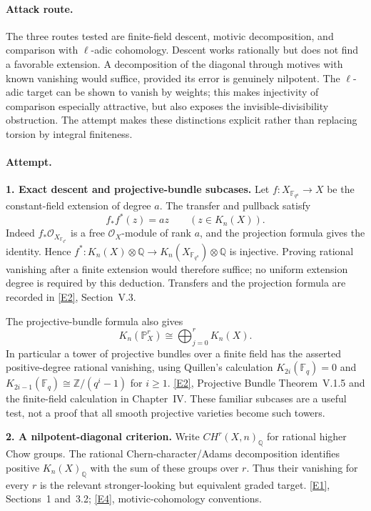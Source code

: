 \documentclass[11pt,a4paper]{article}
\newcommand{\Z}{\mathbb{Z}}
\newcommand{\Q}{\mathbb{Q}}
\newcommand{\F}{\mathbb{F}}
\newcommand{\PP}{\mathbb P}
\newcommand{\eref}[2]{\hyperlink{extra:#1:#2}{[E#2]}}
\numberwithin{equation}{section}
\begin{document}
\paragraph{Attack route.}
The three routes tested are finite-field descent, motivic decomposition,
and comparison with $\ell$-adic cohomology. Descent works rationally but
does not find a favorable extension. A decomposition of the diagonal
through motives with known vanishing would suffice, provided its error
is genuinely nilpotent. The $\ell$-adic target can be shown to vanish by
weights; this makes injectivity of comparison especially attractive,
but also exposes the invisible-divisibility obstruction. The attempt
makes these distinctions explicit rather than replacing torsion by
integral finiteness.

\paragraph{Attempt.}
\textbf{1. Exact descent and projective-bundle subcases.}
Let $f:X_{\F_{q^a}}\to X$ be the constant-field extension of degree $a$.
The transfer and pullback satisfy
\[
 f_*f^*(z)=a z\qquad(z\in K_n(X)).
\]
Indeed $f_*\mathcal O_{X_{\F_{q^a}}}$ is a free $\mathcal O_X$-module
of rank $a$, and the projection formula gives the identity. Hence
$f^*:K_n(X)\otimes\Q\to K_n(X_{\F_{q^a}})\otimes\Q$ is injective.
Proving rational vanishing after a finite extension would therefore
suffice; no uniform extension degree is required by this deduction.
Transfers and the projection formula are recorded in \eref{statement}{2},
Section~V.3.

The projective-bundle formula also gives
\[
 K_n(\PP^r_X)\cong\bigoplus_{j=0}^r K_n(X).
\]
In particular a tower of projective bundles over a finite field has the
asserted positive-degree rational vanishing, using Quillen's calculation
$K_{2i}(\F_q)=0$ and
$K_{2i-1}(\F_q)\cong\Z/(q^i-1)$ for $i\ge1$.
\eref{statement}{2}, Projective Bundle Theorem~V.1.5 and the finite-field
calculation in Chapter~IV. These familiar subcases are a useful test,
not a proof that all smooth projective varieties become such towers.

\textbf{2. A nilpotent-diagonal criterion.}
Write $CH^r(X,n)_{\Q}$ for rational higher Chow groups. The rational
Chern-character/Adams decomposition identifies positive $K_n(X)_{\Q}$
with the sum of these groups over $r$. Thus their vanishing for every
$r$ is the relevant stronger-looking but equivalent graded target.
\eref{statement}{1}, Sections~1 and~3.2; \eref{statement}{4}, motivic-cohomology
conventions.
\end{document}
